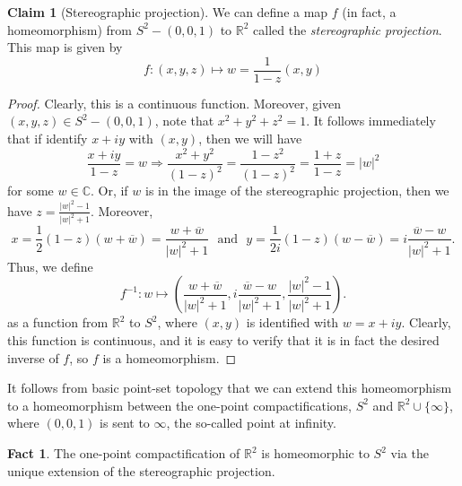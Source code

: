 \documentclass[aps,pra,showpacs,notitlepage,onecolumn,superscriptaddress,nofootinbib]{revtex4-1}
\theoremstyle{definition}
\newtheorem{fact}{Fact}[section]
\newtheorem{claim}{Claim}[section]
\begin{document}
\begin{claim}[Stereographic projection]
  We can define a map $f$ (in fact, a homeomorphism) from $S^{2} - (0, 0, 1)$ to $\mathbb{R}^2$ called the \emph{stereographic projection}. This map is given by
  \begin{equation}
    f : (x, y, z) \mapsto w = \frac{1}{1 - z} (x, y)
    \end{equation}
\end{claim}
\begin{proof}
  Clearly, this is a continuous function. Moreover, given $(x, y, z) \in S^{2} - (0, 0, 1)$, note that $x^2 + y^2 + z^2 = 1$. It follows immediately that if identify $x + iy$ with $(x, y)$, then
  we will have
  \begin{equation}
    \frac{x + iy}{1 - z} = w \Longrightarrow \frac{x^2 + y^2}{(1 - z)^2} = \frac{1 - z^2}{(1 - z)^2} = \frac{1 + z}{1 - z} = |w|^2
  \end{equation}
  for some $w \in \mathbb{C}$. Or, if $w$ is in the image of the stereographic projection, then we have $z = \frac{|w|^2 - 1}{|w|^2 + 1}$. Moreover,
  \begin{equation}
    x = \frac{1}{2} (1 - z) (w + \overline{w}) = \frac{w + \overline{w}}{|w|^2 + 1} \ \ \ \text{and} \ \ \ y = \frac{1}{2i} (1 - z) (w - \overline{w}) = i \frac{\overline{w} - w}{|w|^2 + 1}.
  \end{equation}
  Thus, we define
  \begin{equation}
    f^{-1} : w \mapsto \left( \frac{w + \overline{w}}{|w|^2 + 1}, i \frac{\overline{w} - w}{|w|^2 + 1}, \frac{|w|^2 - 1}{|w|^2 + 1} \right).
  \end{equation}
  as a function from $\mathbb{R}^2$ to $S^2$, where $(x, y)$ is identified with $w = x + iy$. Clearly, this function is continuous, and it is easy to verify that it is in fact the desired inverse of $f$, so $f$ is a homeomorphism.
\end{proof}

It follows from basic point-set topology that we can extend this
homeomorphism to a homeomorphism between the one-point compactifications, $S^2$ and $\mathbb{R}^2 \cup \{\infty\}$, where $(0, 0, 1)$ is sent to $\infty$, the so-called point at infinity.

\begin{fact}
  The one-point compactification of $\mathbb{R}^2$ is homeomorphic to $S^2$ via the unique extension of the stereographic projection.
\end{fact}
\end{document}
